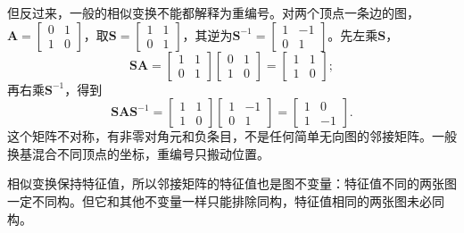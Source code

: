 但反过来，一般的相似变换不能都解释为重编号。对两个顶点一条边的图，$\bm A=\left[\begin{smallmatrix}0&1\\1&0\end{smallmatrix}\right]$，取$\bm S=\left[\begin{smallmatrix}1&1\\0&1\end{smallmatrix}\right]$，其逆为$\bm S^{-1}=\left[\begin{smallmatrix}1&-1\\0&1\end{smallmatrix}\right]$。先左乘$\bm S$，
\[
\bm S\bm A
=\begin{bmatrix}1&1\\0&1\end{bmatrix}
\begin{bmatrix}0&1\\1&0\end{bmatrix}
=\begin{bmatrix}1&1\\1&0\end{bmatrix};
\]
再右乘$\bm S^{-1}$，得到
\[
\bm S\bm A\bm S^{-1}
=\begin{bmatrix}1&1\\1&0\end{bmatrix}
\begin{bmatrix}1&-1\\0&1\end{bmatrix}
=\begin{bmatrix}1&0\\1&-1\end{bmatrix}.
\]
这个矩阵不对称，有非零对角元和负条目，不是任何简单无向图的邻接矩阵。一般换基混合不同顶点的坐标，重编号只搬动位置。

相似变换保持特征值，所以邻接矩阵的特征值也是图不变量：特征值不同的两张图一定不同构。但它和其他不变量一样只能排除同构，特征值相同的两张图未必同构。
